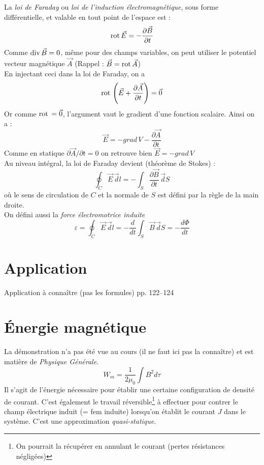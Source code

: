 \documentclass[11pt, a4paper, openany]{book}
\begin{document}
		La \textit{loi de Faraday} ou \textit{loi de l'induction électromagnétique}, sous forme différentielle, et valable en tout point de l'espace est : \begin{equation}
		\rot\vec E=-\frac{\partial \vec B}{\partial t}
		\end{equation}
		Comme $\divv\vec B=0$, même pour des champs variables, on peut utiliser le potentiel vecteur magnétique $\vec A$ (Rappel : $\vec B=\rot\vec A$)\\
		En injectant ceci dans la loi de Faraday, on a \begin{equation}
		\rot\left(\vec E+\frac{\partial \vec A}{\partial t}\right)=\vec{0}
		\end{equation}
		Or comme $\rot =\vec{0}$, l'argument vaut le gradient d'une fonction scalaire. Ainsi on a : \begin{equation}
		\vec E=-grad\,V-\frac{\partial\vec A}{\partial t}
		\end{equation}
		Comme en statique $\partial\vec A/\partial t=0$ on retrouve bien $\vec E=-grad\,V$\\
		Au niveau intégral, la loi de Faraday devient (théorème de Stokes) : \begin{equation}
		\oint_C\vec E\,\vec dl=-\int_S\frac{\partial\vec B}{\partial t}\,\vec dS
		\end{equation}où le sens de circulation de $C$ et la normale de $S$ est défini par la règle de la main droite.\\
		On défini aussi la \textit{force électromotrice induite}\begin{equation}
		\varepsilon=\oint_C\vec E\,\vec dl=-\frac{d}{dt}\int_S\vec B\,\vec dS=-\frac{d\Phi}{dt}
		\end{equation}
		\setcounter{section}{2}
		\section{Application}
		Application à connaître (pas les formules) pp. 122--124
		\section{Énergie magnétique}
		La démonstration n'a pas été vue au cours (il ne faut ici pas la connaître) et est matière de \textit{Physique Générale}.
		\begin{equation}
		W_m = \frac{1}{2\mu_0}\int B^2 d\tau
		\end{equation}
		Il s'agit de l'énergie nécessaire pour établir une certaine configuration de densité de courant. C'est également le travail réversible\footnote{On pourrait la récupérer en annulant le courant (pertes résistances négligées)} à effectuer pour contrer le champ électrique induit (= fem induite) lorsqu'on établit le courant $J$ dans le système. C'est une approximation \textit{quasi-statique}.
		
\end{document}
